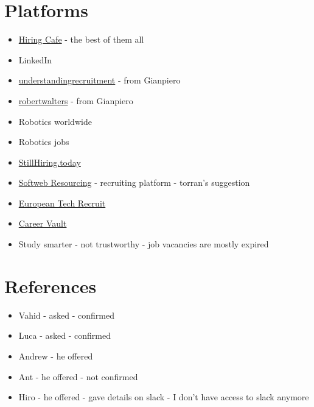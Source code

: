 \section*{Platforms}
\begin{itemize}
  \item \href{https://hiring.cafe/}{Hiring Cafe} - the best of them all
\item LinkedIn
\item \href{https://www.understandingrecruitment.com/}{understandingrecruitment} - from Gianpiero
\item \href{http://robertwalters.co.uk/}{robertwalters} - from Gianpiero
\item Robotics worldwide
\item Robotics jobs
\item \href{https://stillhiring.today/}{StillHiring.today}
\item
    \href{https://www.softwebresourcing.com/}{Softweb Resourcing} - recruiting platform - torran's suggestion
\item
    \href{https://eu-recruit.com/jobs/}{European Tech Recruit}
\item
    \href{https://careervault.io/}{Career Vault}
\item
    Study smarter - not trustworthy - job vacancies are mostly expired
\end{itemize}

\section*{References}
\begin{itemize}
\item Vahid - asked - confirmed
\item Luca - asked - confirmed
\item Andrew - he offered
\item Ant - he offered - not confirmed
\item Hiro - he offered - gave details on slack - I don't have access to slack
  anymore
\end{itemize}

